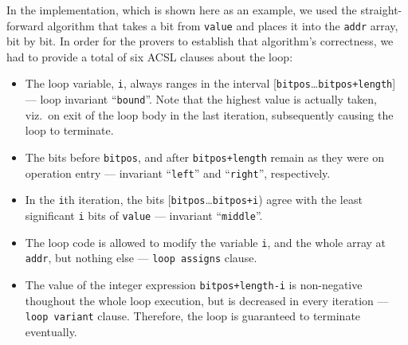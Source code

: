 In the implementation, which is shown here as an example, we used the straight-forward
algorithm that takes a bit from \lstinline{value} and places it into the \lstinline{addr}
array, bit by bit.
%
In order for the provers to establish that algorithm's correctness, we had to provide a
total of six ACSL clauses about the loop:
%
\begin{itemize}
\item The loop variable, \lstinline{i}, always ranges in the interval
	[\lstinline{bitpos}\ldots\lstinline{bitpos+length}] 
	--- loop invariant ``\lstinline{bound}''.
	Note that the highest value is actually taken,
	viz.\ on exit of the loop body in the last iteration,
	subsequently causing the loop to terminate.
\item The bits before \lstinline{bitpos}, and after \lstinline{bitpos+length}
	remain as they were on operation entry --- invariant
	``\lstinline{left}'' and ``\lstinline{right}'', respectively.
\item In the \lstinline{i}th iteration, the bits
	[\lstinline{bitpos}\ldots\lstinline{bitpos+i}) agree with the least significant
	\lstinline{i} bits of \lstinline{value} --- invariant ``\lstinline{middle}''.
\item The loop code is allowed to modify the variable \lstinline{i}, and the whole array
	at \lstinline{addr}, but nothing else --- \lstinline{loop assigns} clause.
\item The value of the integer
	expression \lstinline{bitpos+length-i} is non-negative thoughout
	the whole loop execution, but is decreased in every iteration 
	--- \lstinline{loop variant} clause.
	Therefore, the loop is guaranteed to terminate eventually.
\end{itemize}









